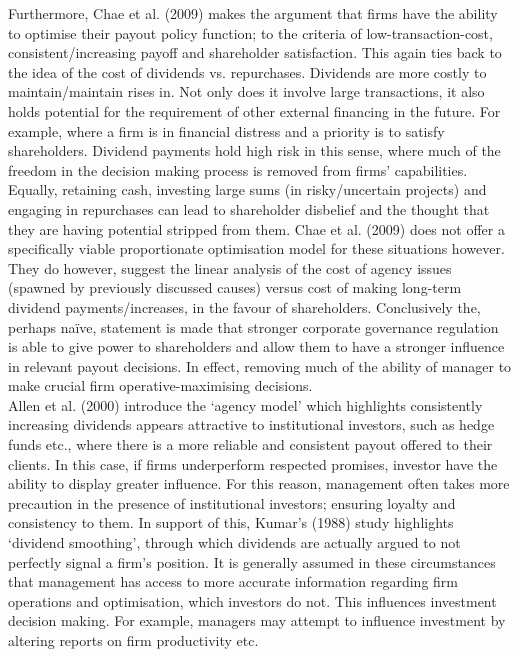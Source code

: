 \documentclass[11pt, english]{article}
\begin{document}
	Furthermore, Chae et al. (2009) makes the argument that firms have the ability to optimise their payout policy function; to the criteria of low-transaction-cost, consistent/increasing payoff and shareholder satisfaction. This again ties back to the idea of the cost of dividends vs. repurchases. Dividends are more costly to maintain/maintain rises in. Not only does it involve large transactions, it also holds potential for the requirement of other external financing in the future. For example, where a firm is in financial distress and a priority is to satisfy shareholders. Dividend payments hold high risk in this sense, where much of the freedom in the decision making process is removed from firms’ capabilities. Equally, retaining cash, investing large sums (in risky/uncertain projects) and engaging in repurchases can lead to shareholder disbelief and the thought that they are having potential stripped from them. Chae et al. (2009) does not offer a specifically viable proportionate optimisation model for these situations however. They do however, suggest the linear analysis of the cost of agency issues (spawned by previously discussed causes) versus cost of making long-term dividend payments/increases, in the favour of shareholders. Conclusively the, perhaps na\"{i}ve, statement is made that stronger corporate governance regulation is able to give power to shareholders and allow them to have a stronger influence in relevant payout decisions. In effect, removing much of the ability of manager to make crucial firm operative-maximising decisions.\\

	Allen et al. (2000) introduce the ‘agency model’ which highlights consistently increasing dividends appears attractive to institutional investors, such as hedge funds etc., where there is a more reliable and consistent payout offered to their clients. In this case, if firms underperform respected promises, investor have the ability to display greater influence. For this reason, management often takes more precaution in the presence of institutional investors; ensuring loyalty and consistency to them. In support of this, Kumar’s (1988) study highlights ‘dividend smoothing’, through which dividends are actually argued to not perfectly signal a firm’s position. It is generally assumed in these circumstances that management has access to more accurate information regarding firm operations and optimisation, which investors do not. This influences investment decision making. For example, managers may attempt to influence investment by altering reports on firm productivity etc.\\
\end{document}
